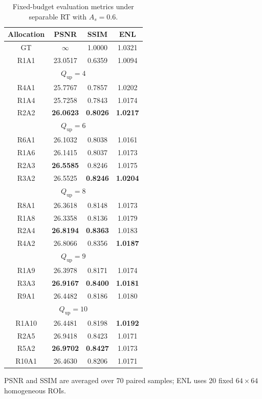 \documentclass[conference]{IEEEtran}
\begin{document}
\begin{table}[t]
\caption{Fixed-budget evaluation metrics under separable RT with $A_s=0.6$.}
\label{tab:evaluation_indexes}
\centering
\scriptsize
\renewcommand{\arraystretch}{0.84}
\setlength{\tabcolsep}{8pt}
\begin{tabular}{c c c c}
\hline
Allocation & PSNR & SSIM & ENL \\
\hline
GT & $\infty$ & 1.0000 & 1.0321 \\
R1A1 & 23.0517 & 0.6359 & 1.0094 \\
\hline
\multicolumn{4}{c}{$Q_{\mathrm{up}}=4$} \\
\hline
R4A1 & 25.7767 & 0.7857 & 1.0202 \\
R1A4 & 25.7258 & 0.7843 & 1.0174 \\
R2A2 & \textbf{26.0623} & \textbf{0.8026} & \textbf{1.0217} \\
\hline
\multicolumn{4}{c}{$Q_{\mathrm{up}}=6$} \\
\hline
R6A1 & 26.1032 & 0.8038 & 1.0161 \\
R1A6 & 26.1415 & 0.8037 & 1.0173 \\
R2A3 & \textbf{26.5585} & 0.8246 & 1.0175 \\
R3A2 & 26.5525 & \textbf{0.8246} & \textbf{1.0204} \\
\hline
\multicolumn{4}{c}{$Q_{\mathrm{up}}=8$} \\
\hline
R8A1 & 26.3618 & 0.8148 & 1.0173 \\
R1A8 & 26.3358 & 0.8136 & 1.0179 \\
R2A4 & \textbf{26.8194} & \textbf{0.8363} & 1.0183 \\
R4A2 & 26.8066 & 0.8356 & \textbf{1.0187} \\
\hline
\multicolumn{4}{c}{$Q_{\mathrm{up}}=9$} \\
\hline
R1A9 & 26.3978 & 0.8171 & 1.0174 \\
R3A3 & \textbf{26.9167} & \textbf{0.8400} & \textbf{1.0181} \\
R9A1 & 26.4482 & 0.8186 & 1.0180 \\
\hline
\multicolumn{4}{c}{$Q_{\mathrm{up}}=10$} \\
\hline
R1A10 & 26.4481 & 0.8198 & \textbf{1.0192} \\
R2A5 & 26.9418 & 0.8423 & 1.0171 \\
R5A2 & \textbf{26.9702} & \textbf{0.8427} & 1.0173 \\
R10A1 & 26.4630 & 0.8206 & 1.0171 \\
\hline
\end{tabular}
\vspace{2pt}

\parbox{0.96\textwidth}{\footnotesize PSNR and SSIM are averaged over 70 paired samples; ENL uses 20 fixed $64\times64$ homogeneous ROIs.}
\end{table}
\end{document}
